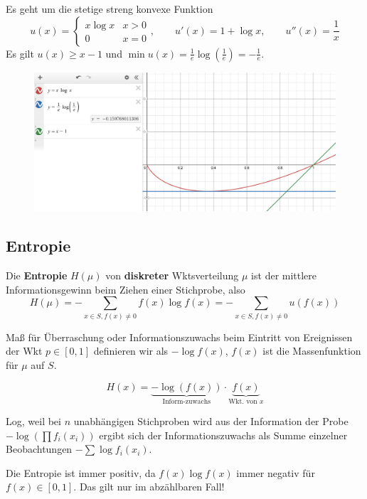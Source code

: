 \begin{outline}
\0 Es geht um die stetige streng konvexe Funktion
$$u(x)=
\begin{cases}
    x\log x & x > 0 \\
    0 & x=0
\end{cases}, \qquad u'(x)=1 + \log x, \qquad u''(x)=\frac{1}{x}$$
\0 Es gilt $u(x)\geq x-1$ und $\min u(x) = \frac{1}{e}\log(\frac{1}{e})=-\frac{1}{e}$.

\begin{figure}
    \centering
    \includegraphics[width=1\linewidth]{IMG_1665.jpeg}
\end{figure}

\subsection{Entropie}

\0 Die \textbf{Entropie} $H(\mu)$ von \textbf{diskreter} Wktsverteilung $\mu$ ist der mittlere Informationsgewinn beim Ziehen einer Stichprobe, also 
$$H(\mu)=-\sum_{x\in S, f(x)\neq 0} f(x)\log f(x)= -\sum_{x\in S, f(x)\neq 0} u(f(x))$$

    \1 Maß für Überraschung oder Informationszuwachs beim Eintritt von Ereignissen der Wkt $p\in[0,1]$ definieren wir als $-\log f(x)$, $f(x)$ ist die Massenfunktion für $\mu$ auf $S$.

    $$H(x)=\underbrace{-\log (f(x))}_{\text{Inform-zuwachs}} \cdot \underbrace{f(x)}_{\text{Wkt. von } x}$$

    \1 Log, weil bei $n$ unabhängigen Stichproben wird aus der Information der Probe $-\log(\prod f_i(x_i))$ ergibt sich der Informationszuwachs als Summe einzelner Beobachtungen $-\sum \log f_i (x_i)$.

    \1 Die Entropie ist immer positiv, da $f(x)\log f(x)$ immer negativ für $f(x)\in [0,1]$. Das gilt nur im abzählbaren Fall!


\end{outline}
